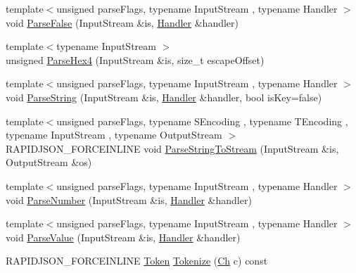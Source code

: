 \begin{DoxyCompactItemize}
\item 
{\footnotesize template$<$unsigned parse\+Flags, typename Input\+Stream , typename Handler $>$ }\\void \mbox{\hyperlink{classrapidjson_1_1_generic_reader_a08ef26ce82243eeb9f8aae7e25b7ecdc}{Parse\+False}} (Input\+Stream \&is, \mbox{\hyperlink{classrapidjson_1_1_handler}{Handler}} \&handler)
\item 
{\footnotesize template$<$typename Input\+Stream $>$ }\\unsigned \mbox{\hyperlink{classrapidjson_1_1_generic_reader_a57872a7f3ec50ac86af7c9972c3fed15}{Parse\+Hex4}} (Input\+Stream \&is, size\+\_\+t escape\+Offset)
\item 
{\footnotesize template$<$unsigned parse\+Flags, typename Input\+Stream , typename Handler $>$ }\\void \mbox{\hyperlink{classrapidjson_1_1_generic_reader_ac8b138efb06521b899fde5cf7355d4f9}{Parse\+String}} (Input\+Stream \&is, \mbox{\hyperlink{classrapidjson_1_1_handler}{Handler}} \&handler, bool is\+Key=false)
\item 
{\footnotesize template$<$unsigned parse\+Flags, typename S\+Encoding , typename T\+Encoding , typename Input\+Stream , typename Output\+Stream $>$ }\\R\+A\+P\+I\+D\+J\+S\+O\+N\+\_\+\+F\+O\+R\+C\+E\+I\+N\+L\+I\+NE void \mbox{\hyperlink{classrapidjson_1_1_generic_reader_a986b24c0e5c2a88c238bb5b25b9f374a}{Parse\+String\+To\+Stream}} (Input\+Stream \&is, Output\+Stream \&os)
\item 
{\footnotesize template$<$unsigned parse\+Flags, typename Input\+Stream , typename Handler $>$ }\\void \mbox{\hyperlink{classrapidjson_1_1_generic_reader_a1f7c934e3dad52ecdbd451fb39bb2db6}{Parse\+Number}} (Input\+Stream \&is, \mbox{\hyperlink{classrapidjson_1_1_handler}{Handler}} \&handler)
\item 
{\footnotesize template$<$unsigned parse\+Flags, typename Input\+Stream , typename Handler $>$ }\\void \mbox{\hyperlink{classrapidjson_1_1_generic_reader_aea57ade5200fd355a021e87167f4621b}{Parse\+Value}} (Input\+Stream \&is, \mbox{\hyperlink{classrapidjson_1_1_handler}{Handler}} \&handler)
\item 
R\+A\+P\+I\+D\+J\+S\+O\+N\+\_\+\+F\+O\+R\+C\+E\+I\+N\+L\+I\+NE \mbox{\hyperlink{classrapidjson_1_1_generic_reader_a3fc870df419c60425cea2a15d36790d1}{Token}} \mbox{\hyperlink{classrapidjson_1_1_generic_reader_adbc5d96d8d54b3e42593949e7d0e9884}{Tokenize}} (\mbox{\hyperlink{classrapidjson_1_1_generic_reader_a0781d19e8c6bc044d9cc5f5d3dde287e}{Ch}} c) const

\end{DoxyCompactItemize}
